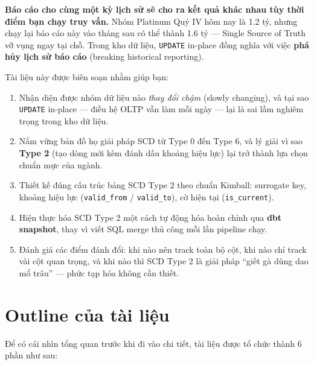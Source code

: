 \documentclass[12pt]{article}
\begin{document}
\begin{notebox}
\textbf{Báo cáo cho cùng một kỳ lịch sử sẽ cho ra kết quả khác nhau tùy thời điểm bạn chạy truy vấn.} Nhóm Platinum Quý IV hôm nay là 1.2 tỷ, nhưng chạy lại báo cáo này vào tháng sau có thể thành 1.6 tỷ --- Single Source of Truth vỡ vụng ngay tại chỗ. Trong kho dữ liệu, \texttt{UPDATE} in-place đồng nghĩa với việc \textbf{phá hủy lịch sử báo cáo} (breaking historical reporting).
\end{notebox}

Tài liệu này được biên soạn nhằm giúp bạn:
\begin{enumerate}
    \item Nhận diện được nhóm dữ liệu nào \textit{thay đổi chậm} (slowly changing), và tại sao \texttt{UPDATE} in-place --- điều hệ OLTP vẫn làm mỗi ngày --- lại là sai lầm nghiêm trọng trong kho dữ liệu.
    \item Nắm vững bản đồ họ giải pháp SCD từ Type 0 đến Type 6, và lý giải vì sao \textbf{Type 2} (tạo dòng mới kèm đánh dấu khoảng hiệu lực) lại trở thành lựa chọn chuẩn mực của ngành.
    \item Thiết kế đúng cấu trúc bảng SCD Type 2 theo chuẩn Kimball: surrogate key, khoảng hiệu lực (\texttt{valid\_from} / \texttt{valid\_to}), cờ hiện tại (\texttt{is\_current}).
    \item Hiện thực hóa SCD Type 2 một cách tự động hóa hoàn chỉnh qua \textbf{dbt snapshot}, thay vì viết SQL merge thủ công mỗi lần pipeline chạy.
    \item Đánh giá các điểm đánh đổi: khi nào nên track toàn bộ cột, khi nào chỉ track vài cột quan trọng, và khi nào thì SCD Type 2 là giải pháp ``giết gà dùng dao mổ trâu'' --- phức tạp hóa không cần thiết.
\end{enumerate}


\section{Outline của tài liệu}

Để có cái nhìn tổng quan trước khi đi vào chi tiết, tài liệu được tổ chức thành 6 phần như sau:
\end{document}
